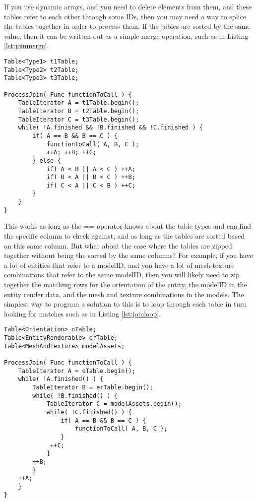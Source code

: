 If you use dynamic arrays, and you need to delete elements from them, and these
tables refer to each other through some IDs, then you may need a way to splice
the tables together in order to process them. If the tables are sorted by the
same value, then it can be written out as a simple merge operation, such as in
Listing \ref{lst:joinmerge}.

\begin{lstlisting}[caption=Zipping together multiple tables by merging,float=h,label=lst:joinmerge]
Table<Type1> t1Table;
Table<Type2> t2Table;
Table<Type3> t3Table;

ProcessJoin( Func functionToCall ) {
	TableIterator A = t1Table.begin();
	TableIterator B = t2Table.begin();
	TableIterator C = t3Table.begin();
	while( !A.finished && !B.finished && !C.finished ) {
		if( A == B && B == C ) {
			functionToCall( A, B, C );
			++A; ++B; ++C;
		} else {
			if( A < B || A < C ) ++A;
			if( B < A || B < C ) ++B;
			if( C < A || C < B ) ++C;
		}
	}
}
\end{lstlisting}

This works as long as the == operator knows about the table types and can find
the specific column to check against, and as long as the tables are sorted
based on this same column. But what about the case where the tables are zipped
together without being the sorted by the same columns? For example, if you have
a lot of entities that refer to a modelID, and you have a lot of mesh-texture
combinations that refer to the same modelID, then you will likely need to zip
together the matching rows for the orientation of the entity, the modelID in
the entity render data, and the mesh and texture combinations in the models.
The simplest way to program a solution to this is to loop through each table in
turn looking for matches such as in Listing \ref{lst:joinloop}.

\begin{lstlisting}[caption=Join by looping through all tables,label=lst:joinloop,float=h]
Table<Orientation> oTable;
Table<EntityRenderable> erTable;
Table<MeshAndTexture> modelAssets;

ProcessJoin( Func functionToCall ) {
	TableIterator A = oTable.begin();
	while( !A.finished() ) {
		TableIterator B = erTable.begin();
		while( !B.finished() ) {
			TableIterator C = modelAssets.begin();
			while( !C.finished() ) {
				if( A == B && B == C ) {
					functionToCall( A, B, C );
				}
			 ++C;
			}
		++B;
		}
	++A;
	}
}
\end{lstlisting}


